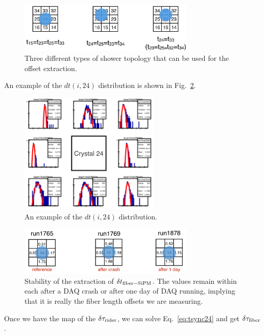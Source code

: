 \begin{figure}[htbp]
\centering
\includegraphics[width=0.75\textwidth]{pics/ShowerTopology.pdf} 
\caption{Three different types of shower topology that can be used for the offset extraction.}\label{fig:ShowerTopology}
\end{figure}

An example of the $dt(i,24)$ distribution is shown in Fig.~\ref{fig:dti24Distribution}.
\begin{figure}[htbp]
\centering
\includegraphics[width=0.6\textwidth]{pics/dt_i_24_Distribution.pdf} 
\caption{An example of the $dt(i,24)$ distribution.}\label{fig:dti24Distribution}
\end{figure}

\begin{figure}[htbp]
\centering
\includegraphics[width=0.75\textwidth]{pics/dt_fiber_Stability.pdf} 
\caption{Stability of the extraction of $\delta t_{\rm{fiber-SiPM}}$. The values remain within each after a DAQ crash or after one day of DAQ running, implying that it is really the fiber length offsets we are measuring.}\label{fig:dtFiberStability}
\end{figure}

Once we have the map of the $\delta \tau_{\rm{rider}}$, we can solve Eq.~\ref{eq:tsync24} and get $\delta \tau_{\rm{fiber}}$.

